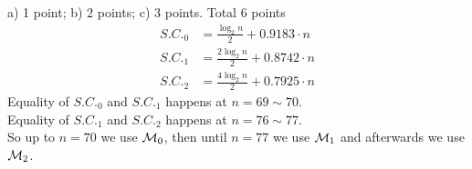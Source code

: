 \documentclass[a4paper]{article}
\begin{document}
\begin{exam}
\begin{vraag}{a) 1 point; b) 2 points; c) 3 points. Total 6 points}
{\begin{align*}
			S.C._0 &= \frac{\log_2n}{2} + 0.9183\cdot n \\
			S.C._1 &= \frac{2\log_2n}{2} + 0.8742\cdot n \\
			S.C._2 &= \frac{4\log_2n}{2} + 0.7925\cdot n
		\end{align*}
		Equality of $S.C._0$ and $S.C._1$ happens at $n=69\sim70$.\\
		Equality of $S.C._1$ and $S.C._2$ happens at $n=76\sim77$.
		\\[\baselineskip]
		So up to $n=70$ we use ${\mathcal M}_0$, then until $n=77$ we use ${\mathcal M}_1$ and afterwards we use ${\mathcal M}_2$.
	}
\end{vraag}

%
%
%
%
%
%
%
\end{exam}
\end{document}
